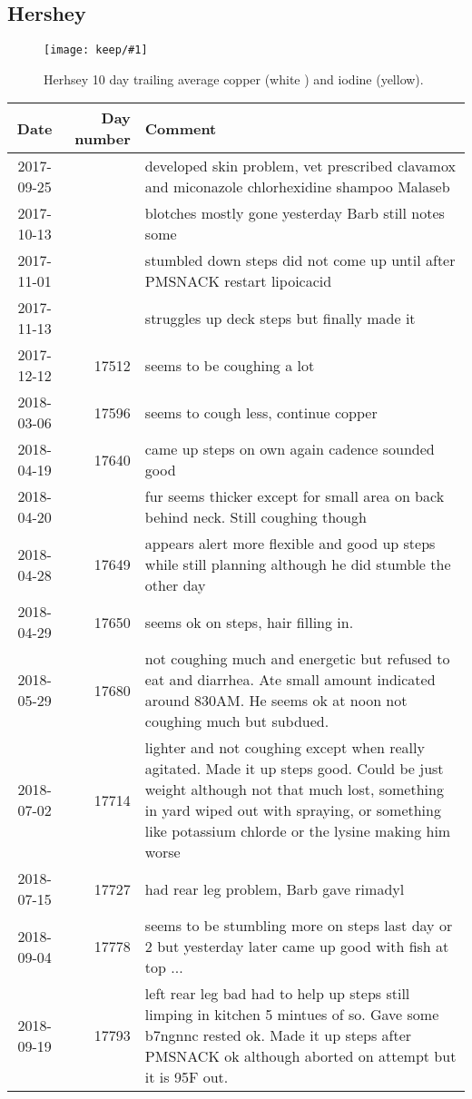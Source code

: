 \documentclass[aps,secnumarabic,balancelastpage,amsmath,amssymb,nofootinbib]{revtex4}
\newlength{\fullfigwidth}  \setlength{\fullfigwidth}{.8\textwidth }
\newcommand{\mjmfullplot}[1]{\texttt{[image: keep/\#1]}}
\newcommand{\mjmhersheycu}{
\begin{figure}[htb] 
\centering
\mjmfullplot{hershey_cu_i.jpg}
\caption{    Herhsey 10 day trailing average copper (white )
and iodine (yellow). 
  }
\end{figure}
} %
\begin{document}
\subsection{Hershey}

\mjmhersheycu


\begin{table}[H] \centering
\begin{tabular}{|c|r|p{4in}|}
\hline
Date & Day number & Comment   \\
\hline
2017-09-25 & &developed skin problem, vet prescribed clavamox and miconazole chlorhexidine shampoo Malaseb   \\
2017-10-13 & & blotches mostly gone yesterday  Barb still notes some  \\
2017-11-01 & &stumbled down steps did not come up until after PMSNACK restart lipoicacid   \\
2017-11-13 & &struggles up deck steps but finally made it \\
2017-12-12 & 17512 & seems to be coughing a lot \\
2018-03-06 & 17596 & seems to cough less, continue copper \\
2018-04-19 & 17640 & came up steps on own again cadence sounded good \\
2018-04-20 & & fur seems thicker except for small area on back behind neck. Still coughing though \\
2018-04-28 & 17649 &appears alert more flexible and good up steps while still planning although he did stumble the other day  \\
2018-04-29 & 17650 & seems ok on steps, hair filling in.  \\
2018-05-29 & 17680 & not coughing much and energetic but refused to eat and diarrhea. Ate small amount indicated around 830AM. He seems ok at noon not coughing much but subdued.    \\
2018-07-02 & 17714 &lighter and not coughing except when really agitated. Made it up steps good. Could be just weight although not that much lost, something in yard wiped out with spraying, or something like potassium chlorde or the lysine making him worse  \\
2018-07-15 & 17727 & had rear leg problem, Barb gave rimadyl \\
2018-09-04 & 17778 &seems to be stumbling more on steps last day or 2 but yesterday later came up good with fish at top ...  \\
2018-09-19 & 17793 & left rear leg bad had to help up steps still limping in kitchen 5 mintues of so. Gave some b7ngnnc rested ok. Made it up steps after PMSNACK ok although aborted on attempt but it is 95F out.   \\

\end{tabular}
\end{table}
\end{document}
